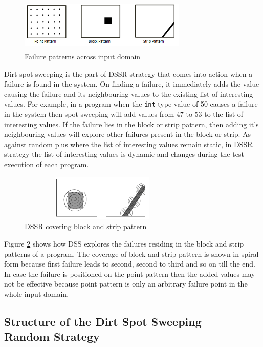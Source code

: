 \documentclass{acm_proc_article-sp}
\begin{document}
\begin{figure}[ht]                                    
\centering
\includegraphics[width= 8cm,height=2.5cm]{ART_Patterns.png}
\caption{Failure patterns across input domain~\cite{Chen2008}}
\label{fig:patterns}
\end{figure}

Dirt spot sweeping is the part of DSSR strategy that comes into action when a failure is found in the system. On finding a failure, it immediately adds the value causing the failure and its neighbouring values to the existing list of interesting values. For example, in a program when the \verb+int+ type value of 50 causes a failure in the system then spot sweeping will add values from 47 to 53 to the list of interesting values. If the failure lies in the block or strip pattern, then adding it's neighbouring values will explore other failures present in the block or strip. As against random plus where the list of interesting values remain static, in DSSR strategy the list of interesting values is dynamic and changes during the test execution of each program.

\begin{figure}[ht]
\centering
\includegraphics[width=8cm,height=2.2cm]{block2.png}
\caption{DSSR covering block and strip pattern}
\label{fig:block2}
\end{figure}

Figure \ref{fig:block2} shows how DSS explores the failures residing in the block and strip patterns of a program. The coverage of block and strip pattern is shown in spiral form because first failure leads to second, second to third and so on till the end. In case the failure is positioned on the point pattern then the added values may not be effective because point pattern is only an arbitrary failure point in the whole input domain.

\subsection{Structure of the Dirt Spot Sweeping \\ Random Strategy}
\end{document}

